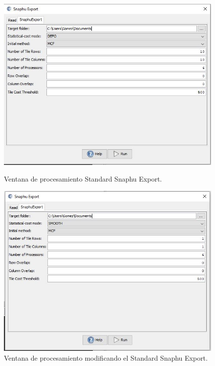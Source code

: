 \documentclass{article}
\begin{document}
\begin{enumerate}
\begin{figure}[htbp]
\begin{minipage}[b]{0.5\linewidth}
\includegraphics[width=\linewidth]{Imagen/23.JPG}
\caption{Ventana de procesamiento Standard Snaphu Export.}
\label{fig:figura23}
\end{minipage}
\hspace{0.5cm}
\begin{minipage}[b]{0.5\linewidth}
\centering
\includegraphics[width=\linewidth]{Imagen/24.JPG}
\caption{Ventana de procesamiento modificando el Standard Snaphu Export.}
\label{fig:figura24}
\end{minipage}
\end{figure}

\end{enumerate}
\end{document}
